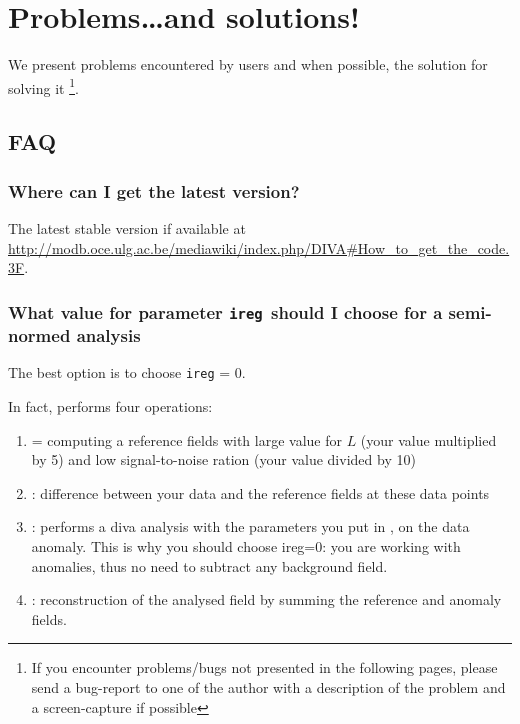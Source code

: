 \chapter{Problems\ldots and solutions!}

We present problems encountered by users and when possible, the solution for solving it \footnote{If you encounter problems/bugs not presented in the following pages, please send a bug-report to one of the author with a description of the problem and a screen-capture if possible}. 

\minitoc


\section{FAQ}

\subsection{Where can I get the latest \diva version?}

The latest stable version if available at \url{http://modb.oce.ulg.ac.be/mediawiki/index.php/DIVA#How_to_get_the_code.3F}. 


\subsection{What value for parameter \texttt{ireg }should I choose for a semi-normed analysis}

The best option is to choose \texttt{ireg} = 0.


In fact,  performs four operations:
\begin{enumerate}
\item {} = computing a reference fields with large value for $L$ (your
value multiplied by 5) and low signal-to-noise ration (your value divided
by 10)

\item {}: difference between your data and the reference fields at
these data points

\item {}: performs a diva analysis with the parameters you put in
, on the data anomaly. This is why you should choose ireg=0: you
are working with anomalies, thus no need to subtract any background field.

\item {}: reconstruction of the analysed field by summing the reference
and anomaly fields.

\end{enumerate}


